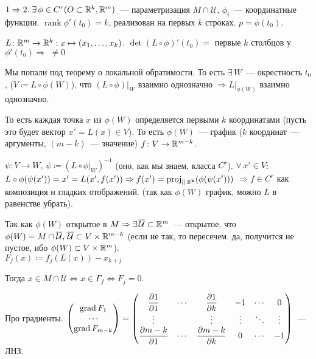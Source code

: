 \begin{Proof}
\newcommand{\UU}{\mathcal{U}}
\newcommand{\UUp}{\overline{\mathcal{U}}}
    $1\Rightarrow 2.\;\exists\,\phi\in C^r(O\subset\rmy[k],\rmy)$~--- параметризация $M\cap\UU$, $\phi_i$~--- координатные функции. $\operatorname{rank}\phi'(t_0)=k$, реализован на первых $k$ строках. $p=\phi(t_0)$.
    
    $L\colon\rmy\to\rmy[k]:x\mapsto(x_1,\ldots,x_k)$. $\det(L\circ\phi)'(t_0)=$ первые $k$ столбцов у $\phi'(t_0)\Rightarrow\;\neq 0$
    
    Мы попали под теорему о локальной обратимости. То есть $\exists\,W$~--- окрестность $t_0$, ($V\coloneqq L\circ\phi(W)$), что $(L\circ\phi)|_W$ взаимно однозначно $\Rightarrow L|_{\phi(W)}$ взаимно однозначно.
    
    То есть каждая точка $x$ из $\phi(W)$ определяется первыми $k$ координатами (пусть это будет вектор $x'=L(x)\in V$). То есть $\phi(W)$~--- график ($k$ координат~--- аргументы, $(m-k)$~--- значение) $f\colon V\to\rmy[m-k]$.
    
    $\psi\colon V\to W,\,\psi\coloneqq (L\circ\phi |_W)^{-1}$ (оно, как мы знаем, класса $C^r$). $\forall\,x'\in V$:\\
    $L\circ\phi(\psi(x'))=x'=L(x',f(x'))\Rightarrow f(x')=\operatorname{proj}_{\mathbf{||\,\rmy[k]}}(\phi(\psi(x')))$ $\Rightarrow f\in C^r$ как композиция н гладких отображений. (так как $\phi(W)$ график, можно $L$ в равенстве убрать).
    
    Так как $\phi(W)$ открытое в $M\Rightarrow\exists\,\UUp\subset\rmy$~--- открытое, что $\phi(W)=M\cap\UUp,\,\UUp\subset V\times\rmy[m-k]$ (если не так, то пересечем. да, получится не пустое, ибо $\phi(W)\subset V\times\rmy$).\\
    $F_j(x)\coloneqq f_j(L(x))-x_{k+j}$
    
    Тогда $x\in M\cap\UUp\Leftrightarrow x\in \Gamma_f\Leftrightarrow F_j=0$.
    
    Про градиенты.
    $\begin{pmatrix}
        \operatorname{grad}F_1\\
        \cdots\\
        \operatorname{grad}F_{m-k}
    \end{pmatrix}=
    \begin{pmatrix}
        \chast{1}{1} & \cdots & \chast{1}{k} & -1 & \cdots & 0\\
        \vdots & & \vdots & \vdots & \ddots & \vdots\\
        \chast{m-k}{1} & \cdots & \chast{m-k}{k} & 0 & \cdots & -1
    \end{pmatrix}$~--- ЛНЗ.
    

\end{Proof}
